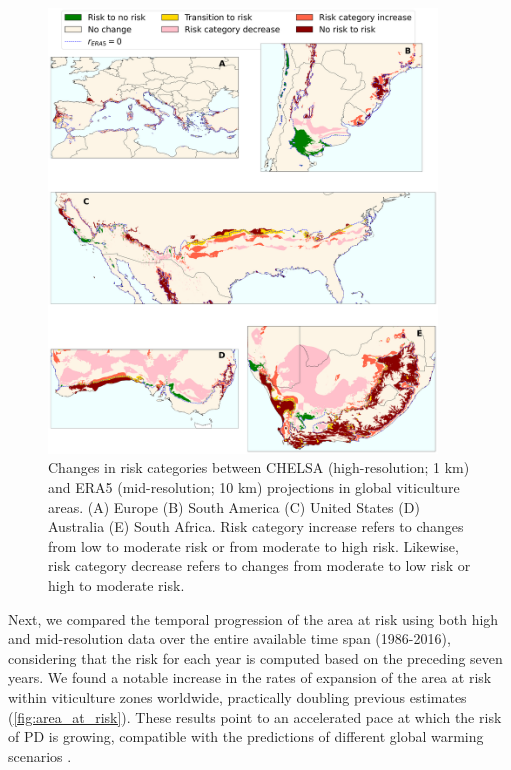 \begin{figure}[H]
    \centering
    \includegraphics[width=0.92\textwidth]{Figures/ERA5_vs_CHELSA_zones.pdf}
    \caption[Changes in risk categories between due to the climate data
        resolution in global viticulture areas]{Changes in risk categories
        between CHELSA (high-resolution; 1 km) and ERA5 (mid-resolution; 10 km)
        projections in global viticulture areas. (A) Europe (B) South America
        (C) United States (D) Australia (E) South Africa. Risk category
        increase refers to changes from low to moderate risk or from moderate
        to high risk. Likewise, risk category decrease refers to changes from
        moderate to low risk or high to moderate risk.}
    \label{fig:risk_categories_dif}
\end{figure}

Next, we compared the temporal progression of the area at risk using both
high and mid-resolution data over the entire available time span (1986-2016),
considering that the risk for each year is computed based on the preceding
seven years. We found a notable increase in the rates of expansion of the area
at risk within viticulture zones worldwide, practically doubling previous
estimates (\cref{fig:area_at_risk}). These results point to an accelerated
pace at which the risk of PD is growing, compatible with the predictions of
different global warming scenarios \cite{GimenezRomero2023_PD}.

